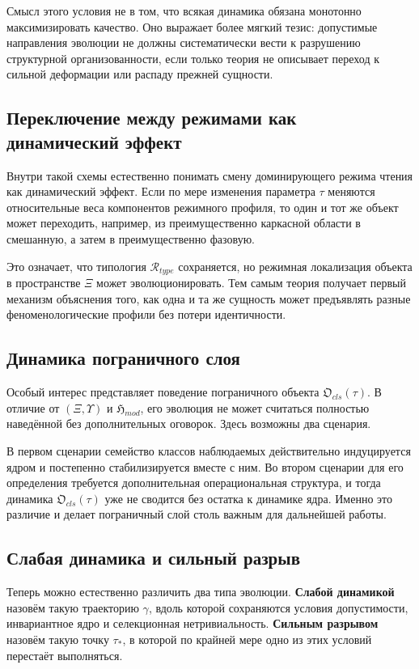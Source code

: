 \documentclass[12pt,a4paper]{article}
\begin{document}
Смысл этого условия не в том, что всякая динамика обязана монотонно максимизировать качество. Оно выражает более мягкий тезис: допустимые направления эволюции не должны систематически вести к разрушению структурной организованности, если только теория не описывает переход к сильной деформации или распаду прежней сущности.

\subsection{Переключение между режимами как динамический эффект}

Внутри такой схемы естественно понимать смену доминирующего режима чтения как динамический эффект. Если по мере изменения параметра \(\tau\) меняются относительные веса компонентов режимного профиля, то один и тот же объект может переходить, например, из преимущественно каркасной области в смешанную, а затем в преимущественно фазовую.

Это означает, что типология \(\mathcal{R}_{type}\) сохраняется, но режимная локализация объекта в пространстве \(\Xi\) может эволюционировать. Тем самым теория получает первый механизм объяснения того, как одна и та же сущность может предъявлять разные феноменологические профили без потери идентичности.

\subsection{Динамика пограничного слоя}

Особый интерес представляет поведение пограничного объекта \(\mathfrak{O}_{cls}(\tau)\). В отличие от \((\Xi,\Upsilon)\) и \(\mathfrak{H}_{mod}\), его эволюция не может считаться полностью наведённой без дополнительных оговорок. Здесь возможны два сценария.

В первом сценарии семейство классов наблюдаемых действительно индуцируется ядром и постепенно стабилизируется вместе с ним. Во втором сценарии для его определения требуется дополнительная операциональная структура, и тогда динамика \(\mathfrak{O}_{cls}(\tau)\) уже не сводится без остатка к динамике ядра. Именно это различие и делает пограничный слой столь важным для дальнейшей работы.

\subsection{Слабая динамика и сильный разрыв}

Теперь можно естественно различить два типа эволюции. \textbf{Слабой динамикой} назовём такую траекторию \(\gamma\), вдоль которой сохраняются условия допустимости, инвариантное ядро и селекционная нетривиальность. \textbf{Сильным разрывом} назовём такую точку \(\tau_*\), в которой по крайней мере одно из этих условий перестаёт выполняться.
\end{document}
